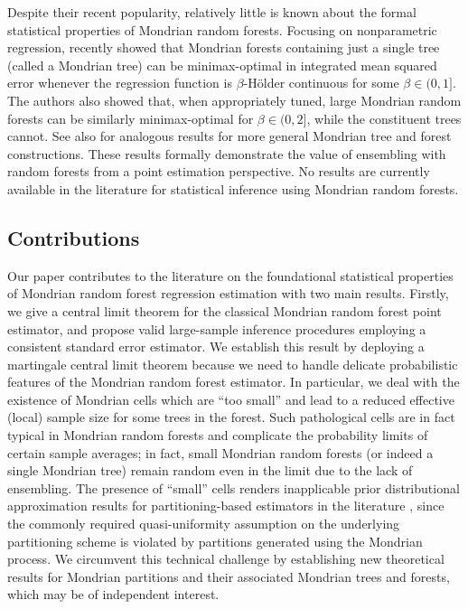 Despite their recent popularity, relatively little is known about the formal
statistical properties of Mondrian random forests. Focusing on nonparametric
regression, \citet{mourtada2020minimax} recently showed that Mondrian forests
containing just a single tree (called a Mondrian tree) can be minimax-optimal
in integrated mean squared error whenever the regression function is
$\beta$-H{\"o}lder continuous for some $\beta \in (0, 1]$. The authors also
showed that, when appropriately tuned, large Mondrian random forests can be
similarly minimax-optimal for $\beta \in (0, 2]$, while the constituent trees
cannot. See also \citet{o2022stochastic} for analogous results for more general
Mondrian tree and forest constructions. These results formally demonstrate the
value of ensembling with random forests from a point estimation perspective. No
results are currently available in the literature for statistical inference
using Mondrian random forests.

\subsection{Contributions}

Our paper contributes to the literature on the foundational statistical
properties of Mondrian random forest regression estimation with two main
results. Firstly, we give a central limit theorem for the classical Mondrian
random forest point estimator, and propose valid large-sample inference
procedures employing a consistent standard error estimator. We establish this
result by deploying a martingale central limit theorem
\citep[Theorem~3.2]{hall2014martingale} because we need to handle delicate
probabilistic features of the Mondrian random forest estimator. In particular,
we deal with the existence of Mondrian cells which are ``too small'' and lead
to a reduced effective (local) sample size for some trees in the forest. Such
pathological cells are in fact typical in Mondrian random forests and
complicate the probability limits of certain sample averages; in fact, small
Mondrian random forests (or indeed a single Mondrian tree) remain random even
in the limit due to the lack of ensembling. The presence of ``small'' cells
renders inapplicable prior distributional approximation results for
partitioning-based estimators in the literature
\citep{huang2003local,cattaneo2020large}, since the commonly required
quasi-uniformity assumption on the underlying partitioning scheme is violated
by partitions generated using the Mondrian process. We circumvent this
technical challenge by establishing new theoretical results for Mondrian
partitions and their associated Mondrian trees and forests, which may be of
independent interest.

